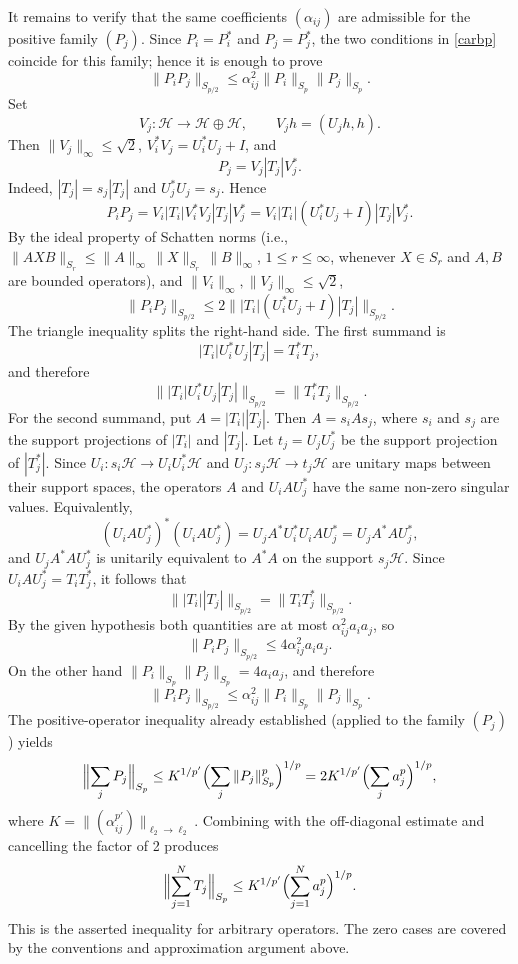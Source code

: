 \documentclass[11pt]{article}
\theoremstyle{definition}
\newcommand{\1}{\mathbf{1}}
\begin{document}
It remains to verify that the same coefficients $(\alpha_{ij})$ are admissible
for the positive family $(P_j)$. Since $P_i=P_i^*$ and $P_j=P_j^*$, the two
conditions in \eqref{carbp} coincide for this family; hence it is enough to
prove
\[
\|P_iP_j\|_{S_{p/2}}
\le
\alpha_{ij}^2\|P_i\|_{S_p}\|P_j\|_{S_p}.
\]
Set
\[
V_j:\mathcal H\to\mathcal H\oplus\mathcal H,\qquad V_jh=(U_jh,h).
\]
Then $\|V_j\|_\infty\le \sqrt2$, $V_i^*V_j=U_i^*U_j+I$, and
\[
P_j=V_j|T_j|V_j^*.
\]
Indeed, $|T_j|=s_j|T_j|$ and $U_j^*U_j=s_j$. Hence
\[
P_iP_j
=
V_i|T_i|V_i^*V_j|T_j|V_j^*
=
V_i|T_i|(U_i^*U_j+I)|T_j|V_j^*.
\]
By the ideal property of Schatten norms (i.e., $\|AXB\|_{S_r}
\le
\|A\|_{\infty}\,\|X\|_{S_r}\,\|B\|_{\infty}$, $1\le r\le \infty$, 
whenever \(X\in S_r\) and \(A,B\) are bounded operators),  and $\|V_i\|_\infty,\|V_j\|_\infty\le
\sqrt2$,
\[
\|P_iP_j\|_{S_{p/2}}
\le
2\bigl\||T_i|(U_i^*U_j+I)|T_j|\bigr\|_{S_{p/2}}.
\]
The triangle inequality splits the right-hand side. The first summand is
\[
|T_i|U_i^*U_j|T_j|=T_i^*T_j,
\]
and therefore
\[
\bigl\||T_i|U_i^*U_j|T_j|\bigr\|_{S_{p/2}}
=
\|T_i^*T_j\|_{S_{p/2}}.
\]
For the second summand, put $A=|T_i||T_j|$. Then
$A=s_iAs_j$, where $s_i$ and $s_j$ are the support projections of $|T_i|$
and $|T_j|$. Let $t_j=U_jU_j^*$ be the support projection of $|T_j^*|$. Since
$U_i:s_i\mathcal H\to U_iU_i^*\mathcal H$ and
$U_j:s_j\mathcal H\to t_j\mathcal H$ are unitary maps between their support
spaces, the operators $A$ and $U_iAU_j^*$ have the same non-zero singular
values. Equivalently,
\[
(U_iAU_j^*)^*(U_iAU_j^*)
=
U_jA^*U_i^*U_iAU_j^*
=
U_jA^*AU_j^*,
\]
and $U_jA^*AU_j^*$ is unitarily equivalent to $A^*A$ on the support $s_j\mathcal
H$. Since $U_iAU_j^*=T_iT_j^*$, it follows that
\[
\bigl\||T_i||T_j|\bigr\|_{S_{p/2}}
=
\|T_iT_j^*\|_{S_{p/2}}.
\]
By the given hypothesis both quantities are at most $\alpha_{ij}^2 a_i a_j$, so
\[
\|P_i P_j\|_{S_{p/2}}\leq 4\alpha_{ij}^2 a_i a_j.
\]
On the other hand $\|P_i\|_{S_p}\|P_j\|_{S_p}=4a_i a_j$, and therefore
\[
\|P_i P_j\|_{S_{p/2}}\leq\alpha_{ij}^2\|P_i\|_{S_p}\|P_j\|_{S_p}.
\]
The positive-operator inequality already established (applied to the family $(P_j)$) yields
\[
\Bigl\|\sum_j P_j\Bigr\|_{S_p}\leq K^{1/p'}\Bigl(\sum_j\|P_j\|_{S_p}^p\Bigr)^{1/p}=2K^{1/p'}\Bigl(\sum_j a_j^p\Bigr)^{1/p},
\]
where $K=\|(\alpha_{ij}^{p'})\|_{\ell_2\to\ell_2}$. Combining with the off-diagonal estimate and cancelling the factor of 2 produces
\[
\Bigl\|\sum_{j=1}^N T_j\Bigr\|_{S_p}\leq K^{1/p'}\Bigl(\sum_{j=1}^N a_j^p\Bigr)^{1/p}.
\]
This is the asserted inequality for arbitrary operators. The zero cases are covered by the conventions and approximation argument above.
\end{document}
